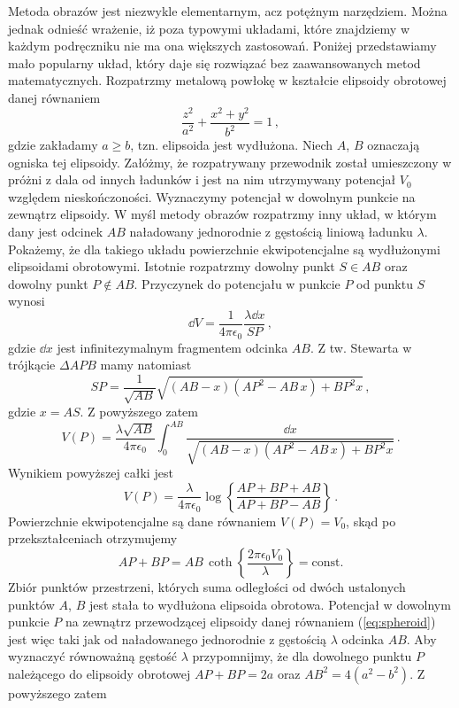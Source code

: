 \documentclass[../main.tex]{subfiles}
\begin{document}
\begin{enumerate}
\medskip
Metoda obrazów jest niezwykle elementarnym, acz potężnym narzędziem. Można jednak odnieść wrażenie, iż poza typowymi układami, które znajdziemy w każdym podręczniku nie ma ona większych zastosowań. Poniżej przedstawiamy mało popularny układ, który daje się rozwiązać bez zaawansowanych metod matematycznych. 
Rozpatrzmy metalową powłokę w kształcie elipsoidy obrotowej danej równaniem
\begin{equation*}\label{eq:spheroid}
    \frac{z^2}{a^2}+\frac{x^2+y^2}{b^2}=1\,,
\end{equation*}
gdzie zakładamy \(a\geq b\), tzn. elipsoida jest wydłużona. Niech \(A\), \(B\) oznaczają ogniska tej elipsoidy. Załóżmy, że rozpatrywany przewodnik został umieszczony w próżni z dala od innych ładunków i jest na nim utrzymywany potencjał \(V_0\) względem nieskończoności. Wyznaczymy potencjał w dowolnym punkcie na zewnątrz elipsoidy. W myśl metody obrazów rozpatrzmy inny układ, w którym dany jest odcinek \(AB\) naładowany jednorodnie z gęstością liniową ładunku \(\lambda\). Pokażemy, że dla takiego układu powierzchnie ekwipotencjalne są wydłużonymi elipsoidami obrotowymi. Istotnie rozpatrzmy dowolny punkt \(S\in AB\) oraz dowolny punkt \(P\notin AB\). Przyczynek do potencjału w punkcie \(P\) od punktu \(S\) wynosi
\begin{equation*}
    \dd V=\frac{1}{4\pi\epsilon_0}\frac{\lambda \dd{x}}{SP}\,,
\end{equation*}
gdzie \(\dd{x}\) jest infinitezymalnym fragmentem odcinka \(AB\). Z tw. Stewarta w trójkącie \(\Delta APB\) mamy natomiast
\begin{equation*}
    SP=\frac{1}{\sqrt{AB}}\sqrt{(AB-x)(AP^2-AB\,x)+BP^2x}\,,
\end{equation*}
gdzie \(x=AS\). Z powyższego zatem
\begin{equation*}
    V(P)=\frac{\lambda \sqrt{AB}}{4\pi\epsilon_0}\int_0^{AB}\frac{\dd{x}}{\sqrt{(AB-x)(AP^2-AB\,x)+BP^2x}}\,.
\end{equation*}
Wynikiem powyższej całki jest
\begin{equation*}
    V(P)=\frac{\lambda}{4\pi\epsilon_0}\log\left\{\frac{AP+BP+AB}{AP+BP-AB}\right\}\,.
\end{equation*}
Powierzchnie ekwipotencjalne są dane równaniem \(V(P)=V_0\), skąd po przekształceniach otrzymujemy
\begin{equation*}
    AP+BP=AB\,\coth\left\{\frac{2\pi\epsilon_0V_0}{\lambda}\right\}=\text{const.}
\end{equation*}
Zbiór punktów przestrzeni, których suma odległości od dwóch ustalonych punktów \(A\), \(B\) jest stała to wydłużona elipsoida obrotowa. Potencjał w dowolnym punkcie \(P\) na zewnątrz przewodzącej elipsoidy danej równaniem (\ref{eq:spheroid}) jest więc taki jak od naładowanego jednorodnie z gęstością \(\lambda\) odcinka \(AB\). Aby wyznaczyć równoważną gęstość \(\lambda\) przypomnijmy, że dla dowolnego punktu \(P\) należącego do elipsoidy obrotowej \(AP+BP=2a\) oraz \(AB^2=4(a^2-b^2)\). Z powyższego zatem

\end{enumerate}
\end{document}
